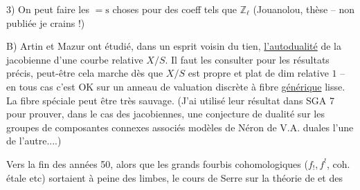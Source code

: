 3) On peut faire les ${=}\mathrm{s}$ choses pour des coeff tels que $\mathbb{Z}_{\ell}$ (Jouanolou, thèse -- non publiée je crains !)


B) Artin et Mazur ont étudié, dans un esprit voisin du tien, \uline{l'autodualité} de la jacobienne d'une courbe relative $X/S$. Il faut les consulter pour les résultats précis, peut-être cela marche dès que $X/S$ est propre et plat de dim relative $1$ -- en tous cas c'est OK sur un anneau de valuation discrète à fibre \uline{générique} lisse. La fibre spéciale peut être très sauvage. (J'ai utilisé leur résultat dans SGA 7 pour prouver, dans le cas des jacobiennes, une conjecture de dualité sur les groupes de composantes connexes associés   modèles de Néron de V.A. duales l'une de l'autre....)


 Vers la fin des années 50, alors que les grands fourbis cohomologiques ($f_{!},f^{!}$, coh. étale etc) sortaient à peine des limbes, le cours de Serre sur la théorie de  et  des 
